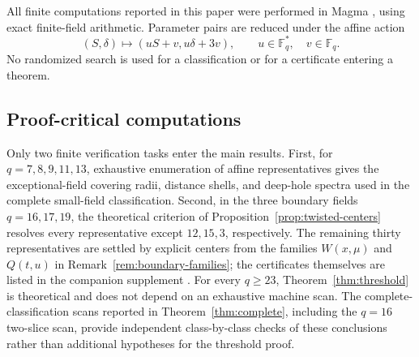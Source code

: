\documentclass[11pt]{article}
\newcommand{\F}{\mathbb F}
\theoremstyle{plain}
\theoremstyle{definition}
\begin{document}
All finite computations reported in this paper were performed in Magma
\cite{Magma1997}, using exact finite-field arithmetic.  Parameter pairs are
reduced under the affine action
\[
 (S,\delta)\longmapsto (uS+v,u\delta+3v),
 \qquad u\in\F_q^{\ast},\quad v\in\F_q.
\]
No randomized search is used for a classification or for a certificate
entering a theorem.

\subsection*{Proof-critical computations}
Only two finite verification tasks enter the main results.  First, for
\(q=7,8,9,11,13\), exhaustive enumeration of affine representatives gives
the exceptional-field covering radii, distance shells, and deep-hole spectra
used in the complete small-field classification.  Second, in the three
boundary fields \(q=16,17,19\), the theoretical criterion of
Proposition~\ref{prop:twisted-centers} resolves every representative except
\(12,15,3\), respectively.  The remaining thirty representatives are
settled by explicit centers from the families \(W(x,\mu)\) and \(Q(t,u)\)
in Remark~\ref{rem:boundary-families}; the certificates themselves are
listed in the companion supplement
.
For every \(q\geq 23\), Theorem~\ref{thm:threshold} is theoretical and does
not depend on an exhaustive machine scan.  The complete-classification scans
reported in Theorem~\ref{thm:complete}, including the \(q=16\) two-slice
scan, provide independent class-by-class checks of these conclusions rather
than additional hypotheses for the threshold proof.
\end{document}
